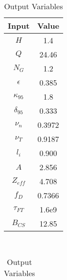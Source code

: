 \begin{table}[h!]
\centering  
\caption{Demo Steady Variables}
\hfill
\begin{subtable}[t]{0.4\textwidth}
\centering  
\caption{Input Variables} ~\\
\begin{tabular}{ c|c } 

Input            & Value           \\
\hline
$H$              & 1.4             \\
$Q$              & 24.46           \\
$N_{G}$          & 1.2             \\
$\epsilon$       & 0.385           \\
$\kappa_{95}$    & 1.8             \\
$\delta_{95}$    & 0.333           \\
$\nu_{n}$        & 0.3972          \\
$\nu_{T}$        & 0.9187          \\
$l_{i}$          & 0.900             \\
$A$              & 2.856           \\
$Z_{eff}$        & 4.708           \\
$f_{D}$          & 0.7366          \\
$\tau_{FT}$      & 1.6e9           \\
$B_{CS}$         & 12.85           \\

\end{tabular}
\end{subtable}
\hfill
\begin{subtable}[t]{0.5\textwidth}
\centering  
\caption{Output Variables} ~\\
\begin{tabular}{ c|c|c|c } 


\end{tabular}
\end{subtable}
\end{table}
